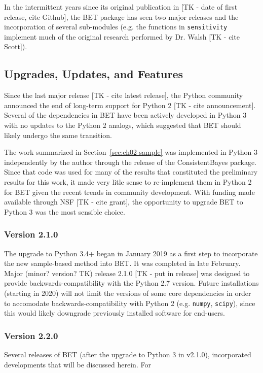In the intermittent years since its original publication in [TK - date of first release, cite Github], the BET package has seen two major releases and the incorporation of several sub-modules (e.g. the functions in {\tt sensitivity} implement much of the original research performed by Dr. Walsh [TK - cite Scott]).


\subsection{Upgrades, Updates, and Features}
Since the last major release [TK - cite latest release], the Python community announced the end of long-term support for Python 2 [TK - cite announcement].
Several of the dependencies in BET have been actively developed in Python 3 with no updates to the Python 2 analogs, which suggested that BET should likely undergo the same transition.

The work summarized in Section~\ref{sec:ch02-sample} was implemented in Python 3 independently by the author through the release of the ConsistentBayes package.
Since that code was used for many of the results that constituted the preliminary results for this work, it made very litle sense to re-implement them in Python 2 for BET given the recent trends in community development.
With funding made available through NSF [TK - cite grant], the opportunity to upgrade BET to Python 3 was the most sensible choice.


\subsubsection{Version 2.1.0}
The upgrade to Python 3.4+ began in January 2019 as a first step to incorporate the new sample-based method into BET.
It was completed in late February.
Major (minor? version? TK) release 2.1.0 [TK - put in release] was designed to provide backwards-compatibility with the Python 2.7 version.
Future installations (starting in 2020) will not limit the versions of some core dependencies in order to accomodate backwards-compatibility with Python 2 (e.g. {\tt numpy}, {\tt scipy}), since this would likely downgrade previously installed software for end-users.


\subsubsection{Version 2.2.0}
Several releases of BET (after the upgrade to Python 3 in v2.1.0), incorporated developments that will be discussed herein.
For


